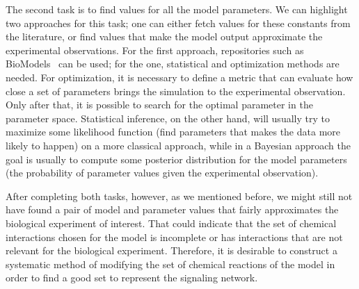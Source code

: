The second task is to find values for all the model parameters. We can
highlight two approaches for this task; one can either fetch values for 
these constants from the literature, or find values that make 
the model output approximate the experimental observations. For the
first approach, repositories such as BioModels~\cite{le2006biomodels} 
can be used; for the one, statistical and optimization
methods are needed. For optimization, it is necessary to define a metric
that can evaluate how close a set of parameters brings the simulation to 
the experimental observation. Only after that, it is possible to search 
for the optimal parameter in the parameter space. Statistical inference, 
on the other hand, will usually try to maximize some likelihood function 
(find parameters that makes the data more likely to happen) on a more 
classical approach, while in a Bayesian approach the goal is usually to
compute some posterior distribution for the model parameters (the 
probability of parameter values given the experimental observation).


After completing both tasks, however, as we mentioned before, we might 
still not have found a pair of model and parameter values that fairly 
approximates the biological experiment of interest. That could indicate 
that the set of chemical interactions chosen for the model is 
incomplete or has interactions that are not relevant for the biological 
experiment. Therefore, it is desirable to construct a systematic method 
of modifying the set of chemical reactions of the model in order to 
find a good set to represent the signaling network.

